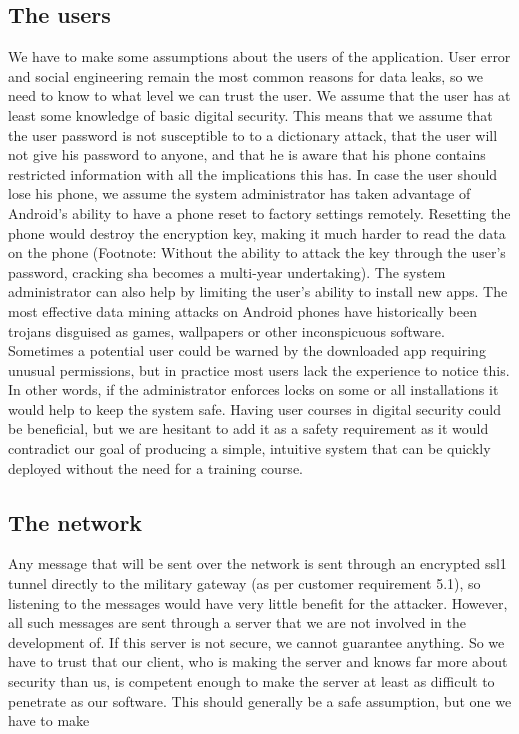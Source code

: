 \subsection{The users}
We have to make some assumptions about the users of the application. User error and social engineering remain the most common reasons for data leaks, so we need to know to what level we can trust the user.
\newline
\newline
We assume that the user has at least some knowledge of basic digital security. This means that we assume that the user password is not susceptible to to a dictionary attack, that the user will not give his password to anyone, and that he is aware that his phone contains restricted information with all the implications this has. 
\newline
\newline
In case the user should lose his phone, we assume the system administrator has taken advantage of Android’s ability to have a phone reset to factory settings remotely. Resetting the phone would destroy the encryption key, making it much harder to read the data on the phone (Footnote: Without the ability to attack the key through the user’s password, cracking \gls{sha} becomes a multi-year undertaking).
\newline
\newline
The system administrator can also help by limiting the user’s ability to install new apps. The most effective data mining attacks on Android phones have historically been trojans disguised as games, wallpapers or other inconspicuous software. Sometimes a potential user could be warned by the downloaded app requiring unusual permissions, but in practice most users lack the experience to notice this. In other words, if the administrator enforces locks on some or all installations it would help to keep the system safe.
\newline
\newline
Having user courses in digital security could be beneficial, but we are hesitant to add it as a safety requirement as it would contradict our goal of producing a simple, intuitive system that can be quickly deployed without the need for a training course. 

\newpage

\subsection{The network}
Any message that will be sent over the network is sent through an encrypted \gls{ssl1} tunnel directly to the military gateway (as per customer requirement 5.1), so listening to the messages would have very little benefit for the attacker. However, all such messages are sent through a server that we are not involved in the development of. If this server is not secure, we cannot guarantee anything. So we have to trust that our client, who is making the server and knows far more about security than us, is competent enough to make the server at least as difficult to penetrate as our software. This should generally be a safe assumption, but one we have to make

